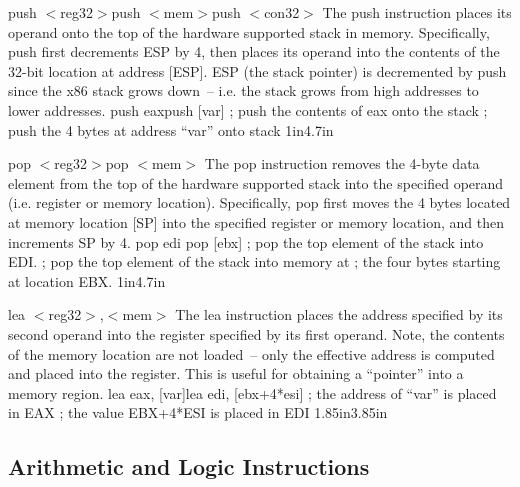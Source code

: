 {push $<$reg32$>$\newline push $<$mem$>$\newline push $<$con32$>$}
{The push instruction places its operand onto the top of the hardware supported
stack in memory. Specifically, push first decrements ESP by 4, then places its
operand into the contents of the 32-bit location at address [ESP]. ESP (the stack
pointer) is decremented by push since the x86 stack grows down~-- i.e. the stack
grows from high addresses to lower addresses.}
{push eax\newline push [var]}
{; push the contents of eax onto the stack\newline
; push the 4 bytes at address ``var'' onto stack}
{1in}{4.7in}

{pop $<$reg32$>$\newline pop $<$mem$>$}
{The pop instruction removes the 4-byte data element from the top of
  the hardware supported stack into the specified operand (i.e.
  register or memory location). Specifically, pop first moves the 4
  bytes located at memory location [SP] into the specified register or
  memory location, and then increments SP by 4.}
{pop edi \newline pop [ebx]}
{; pop the top element of the stack into EDI.\newline
; pop the top element of the stack into memory at\newline
; the four bytes starting at location EBX.}
{1in}{4.7in}

{lea $<$reg32$>$,$<$mem$>$}
{The lea instruction places the address specified by its second
  operand into the register specified by its first operand. Note, the
  contents of the memory location are not loaded~-- only the effective
  address is computed and placed into the register.  This is useful
  for obtaining a ``pointer'' into a memory region.}
{lea eax, [var]\newline lea edi, [ebx+4*esi]}
{; the address of ``var'' is placed in EAX \newline
; the value EBX+4*ESI is placed in EDI}
{1.85in}{3.85in}

\subsection{Arithmetic and Logic Instructions}

